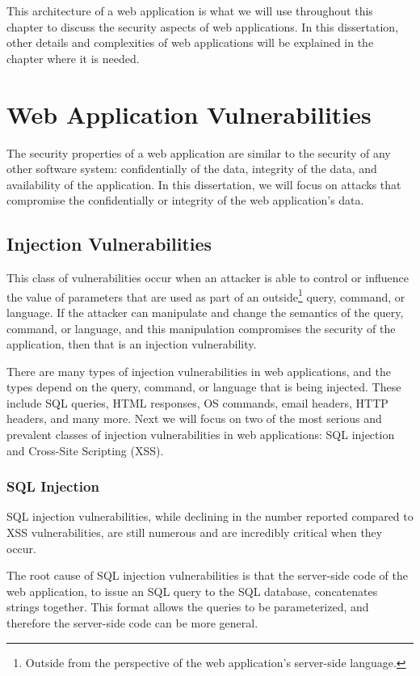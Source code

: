 This architecture of a web application is what we will use throughout
this chapter to discuss the security aspects of web applications. In
this dissertation, other details and complexities of web applications
will be explained in the chapter where it is needed.

\section{Web Application Vulnerabilities}

The security properties of a web application are similar to the
security of any other software system: confidentially of the data,
integrity of the data, and availability of the application. In this
dissertation, we will focus on attacks that compromise the
confidentially or integrity of the web application's data.

\subsection{Injection Vulnerabilities}

This class of vulnerabilities occur when an attacker is able to
control or influence the value of parameters that are used as part of
an outside\footnote{Outside from the perspective of the web
  application's server-side language.} query, command, or language. If
the attacker can manipulate and change the semantics of the query,
command, or language, and this manipulation compromises the security
of the application, then that is an injection vulnerability.

There are many types of injection vulnerabilities in web applications,
and the types depend on the query, command, or language that is being
injected. These include SQL queries, HTML responses, OS commands,
email headers, HTTP headers, and many more. Next we will focus on two
of the most serious and prevalent classes of injection vulnerabilities
in web applications: SQL injection and Cross-Site Scripting (XSS).

\subsubsection{SQL Injection}

SQL injection vulnerabilities, while declining in the number reported
compared to XSS vulnerabilities, are still numerous and are incredibly
critical when they occur.

The root cause of SQL injection vulnerabilities is that the
server-side code of the web application, to issue an SQL query to the
SQL database, concatenates strings together. This format allows the
queries to be parameterized, and therefore the server-side code can be
more general.

